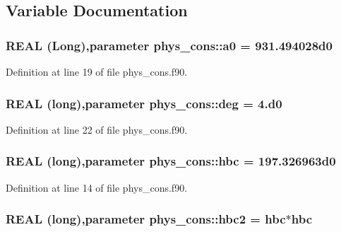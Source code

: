 \subsection{Variable Documentation}
\hypertarget{namespacephys__cons_a02e8bb2c808e0085a317bf36ff79ae2a}{
\subsubsection[{a0}]{\setlength{\rightskip}{0pt plus 5cm}REAL (Long),parameter {\bf phys\_\-cons::a0} = 931.494028d0}}
\label{namespacephys__cons_a02e8bb2c808e0085a317bf36ff79ae2a}


Definition at line 19 of file phys\_\-cons.f90.

\hypertarget{namespacephys__cons_a553e3e17652770308e6bffcb8fcb5a95}{
\subsubsection[{deg}]{\setlength{\rightskip}{0pt plus 5cm}REAL (long),parameter {\bf phys\_\-cons::deg} = 4.d0}}
\label{namespacephys__cons_a553e3e17652770308e6bffcb8fcb5a95}


Definition at line 22 of file phys\_\-cons.f90.

\hypertarget{namespacephys__cons_a3f47589553abc71257ab3e88ef7bbb39}{
\subsubsection[{hbc}]{\setlength{\rightskip}{0pt plus 5cm}REAL (long),parameter {\bf phys\_\-cons::hbc} = 197.326963d0}}
\label{namespacephys__cons_a3f47589553abc71257ab3e88ef7bbb39}


Definition at line 14 of file phys\_\-cons.f90.

\hypertarget{namespacephys__cons_af78d210174277076bb64ff4403f8c9fd}{
\subsubsection[{hbc2}]{\setlength{\rightskip}{0pt plus 5cm}REAL (long),parameter {\bf phys\_\-cons::hbc2} = {\bf hbc}$\ast${\bf hbc}}}
\label{namespacephys__cons_af78d210174277076bb64ff4403f8c9fd}


